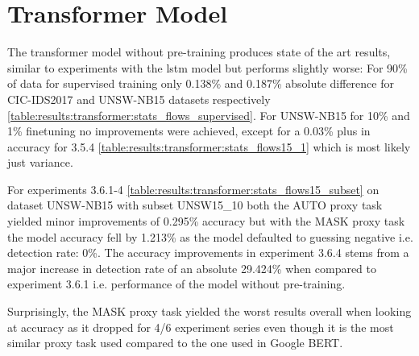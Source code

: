 

\FloatBarrier

\section{Transformer Model} \label{sec:results:transformer}





The transformer model without pre-training produces state of the art results, similar to experiments with the \gls{lstm} model but  performs slightly worse: For 90\% of data for supervised training only 0.138\% and 0.187\% absolute difference for CIC-IDS2017 and UNSW-NB15 datasets respectively \ref{table:results:transformer:stats_flows_supervised}.
For UNSW-NB15 for 10\% and 1\% finetuning no improvements were achieved, except for a 0.03\% plus in accuracy for 3.5.4 \ref{table:results:transformer:stats_flows15_1} which is most likely just variance. \par





For experiments 3.6.1-4 \ref{table:results:transformer:stats_flows15_subset} on dataset UNSW-NB15 with subset UNSW15\_10 both the AUTO proxy task yielded minor improvements of 0.295\% accuracy but with the MASK proxy task the model accuracy fell by 1.213\% as the model defaulted to guessing negative i.e. detection rate: 0\%. The accuracy improvements in experiment 3.6.4 stems from a major increase in detection rate of an absolute 29.424\% when compared to experiment 3.6.1 i.e. performance of the model without pre-training. \par
Surprisingly, the MASK proxy task yielded the worst results overall when looking at accuracy as it dropped for 4/6 experiment series even though it is the most similar proxy task used compared to the one used in Google BERT.






